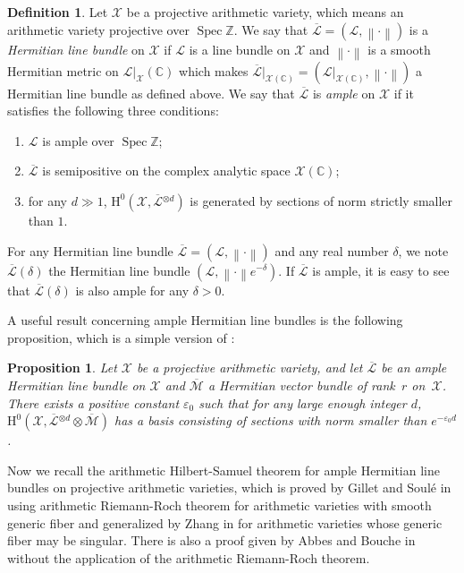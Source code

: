 \documentclass[11pt]{article}
\numberwithin{equation}{section}
\newenvironment{enumeratei}
{\bgroup\def\theenumi{\roman{enumi}}\def\theenumii{\arabic{enumii}}\begin{enumerate}}
{\end{enumerate}\egroup}
\theoremstyle{plain}
\newtheorem{prop}[thm]{Proposition}
\theoremstyle{definition}
\newtheorem*{defi}{Definition}
\newcommand{\ho}{\mathrm{H}}
\newcommand{\X}{\mathcal{X}}
\newcommand{\Li}{\overline{\mathcal{L}}{}}
\newcommand{\li}{\mathcal{L}}
\newcommand{\Z}{\mathbb{Z}}
\newcommand{\bbC}{\mathbb{C}}
\DeclareMathOperator{\Spec}{Spec}
\begin{document}
\begin{defi}
Let $\X$ be a projective arithmetic variety, which means an arithmetic variety projective over $\Spec \Z$. We say that $\Li=(\li, \left\lVert\cdot\right\rVert)$ is a \emph{Hermitian line bundle} on $\X$ if $\li$ is a line bundle on $\X$ and $\left\lVert\cdot\right\rVert$ is a smooth Hermitian metric on $\li|_\X(\bbC)$ which makes $\Li|_{\X(\bbC)}=(\li|_{\X(\bbC)}, \left\lVert\cdot\right\rVert)$ a Hermitian line bundle as defined above. We say that $\Li$ is \emph{ample} on $\X$ if it satisfies the following three conditions:
\begin{enumeratei}
\item $\li$ is ample over $\Spec \Z$;
\item $\Li$ is semipositive on the complex analytic space $\X(\bbC)$;
\item for any $d\gg 1$, $\ho^0(\X,\Li^{\otimes d})$ is generated by sections of norm strictly smaller than $1$.
\end{enumeratei}
\end{defi}

For any Hermitian line bundle $\Li=(\li, \left\lVert\cdot\right\rVert)$ and any real number $\delta$, we note $\Li(\delta)$ the Hermitian line bundle $(\li, \left\lVert\cdot\right\rVert e^{-\delta})$. If $\Li$ is ample, it is easy to see that $\Li(\delta)$ is also ample for any $\delta>0$.

A useful result concerning ample Hermitian line bundles is the following proposition, which is a simple version of \cite[Prop.\,2.4]{Ch17}:
\begin{prop}\label{epsilon}
Let $\X$ be a projective arithmetic variety, and let $\Li$ be an ample Hermitian line bundle on $\X$ and $\overline{\mathcal{M}}$ a Hermitian vector bundle of rank~$r$ on~$\X$. There exists a positive constant $\varepsilon_0$ such that for any large enough integer $d$, \hbox{$\ho^0(\X, \Li^{\otimes d}\otimes \overline{\mathcal{M}})$} has a basis consisting of sections with norm smaller than $e^{-\varepsilon_0 d}$.
\end{prop}
Now we recall the arithmetic Hilbert-Samuel theorem for ample Hermitian line bundles on projective arithmetic varieties, which is proved by Gillet and Soulé in \cite{GS92} using arithmetic Riemann-Roch theorem for arithmetic varieties with smooth generic fiber and generalized by Zhang in \cite{Zh95} for arithmetic varieties whose generic fiber may be singular. There is also a proof given by Abbes and Bouche in \cite{AB95} without the application of the arithmetic Riemann-Roch theorem.
\end{document}
